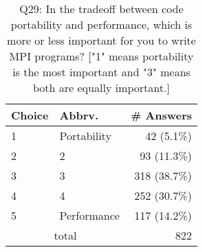 \begin{table}[htb]%
\begin{center}%
\caption{Q29: In the tradeoff between code portability and performance, which is more or less important for you to write MPI programs? ["1" means portability is the most important and "3" means both are equally important.]}%
\label{tab:Q29-ans}%
\begin{tabular}{l|l|r}%
\hline%
Choice & Abbrv. & \# Answers \\%
\hline%
1 & Portability & 42 (5.1\%) \\%
2 & 2 & 93 (11.3\%) \\%
3 & 3 & 318 (38.7\%) \\%
4 & 4 & 252 (30.7\%) \\%
5 & Performance & 117 (14.2\%) \\%
\hline%
\multicolumn{2}{c}{total} & 822 \\%
\hline%
\end{tabular}%
\end{center}%
\end{table}%

